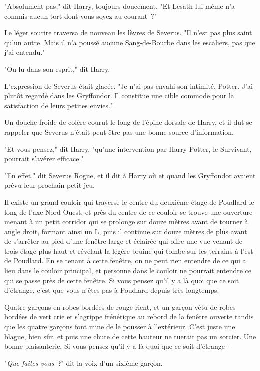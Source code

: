 "Absolument pas," dit Harry, toujours doucement. "Et Lesath lui-même n'a commis aucun tort dont vous soyez au courant~?"

Le léger sourire traversa de nouveau les lèvres de Severus. "Il n'est pas plus saint qu'un autre. Mais il n'a poussé aucune Sang-de-Bourbe dans les escaliers, pas que j'ai entendu."

"Ou lu dans son esprit," dit Harry.

L'expression de Severus était glacée. "Je n'ai pas envahi son intimité, Potter. J'ai plutôt regardé dans les Gryffondor. Il constitue une cible commode pour la satisfaction de leurs petites envies."

Un douche froide de colère courut le long de l'épine dorsale de Harry, et il dut se rappeler que Severus n'était peut-être pas une bonne source d'information.

"Et vous pensez," dit Harry, "qu'une intervention par Harry Potter, le Survivant, pourrait s'avérer efficace."

"En effet," dit Severus Rogue, et il dit à Harry où et quand les Gryffondor avaient prévu leur prochain petit jeu.

\later

Il existe un grand couloir qui traverse le centre du deuxième étage de Poudlard le long de l'axe Nord-Ouest, et près du centre de ce couloir se trouve une ouverture menant à un petit corridor qui se prolonge sur douze mètres avant de tourner à angle droit, formant ainsi un L, puis il continue sur douze mètres de plus avant de s'arrêter au pied d'une fenêtre large et éclairée qui offre une vue venant de trois étage plus haut et révélant la légère bruine qui tombe sur les terrains à l'est de Poudlard. En se tenant à cette fenêtre, on ne peut rien entendre de ce qui a lieu dans le couloir principal, et personne dans le couloir ne pourrait entendre ce qui se passe près de cette fenêtre. Si vous pensez qu'il y a là quoi que ce soit d'étrange, c'est que vous n'êtes pas à Poudlard depuis très longtemps.

Quatre garçons en robes bordées de rouge rient, et un garçon vêtu de robes bordées de vert crie et s'agrippe frénétique au rebord de la fenêtre ouverte tandis que les quatre garçons font mine de le pousser à l'extérieur. C'est juste une blague, bien sûr, et puis une chute de cette hauteur ne tuerait pas un sorcier. Une bonne plaisanterie. Si vous pensez qu'il y a là quoi que ce soit d'étrange -

"\emph{Que faites-vous~?}" dit la voix d'un sixième garçon.

